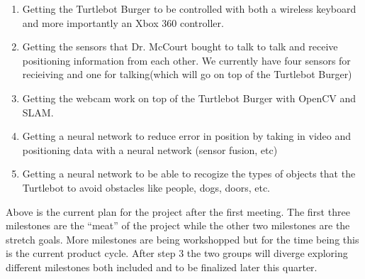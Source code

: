 \documentclass[12pt]{IEEEtran}
\begin{document}
\begin{enumerate}
    \item Getting the Turtlebot Burger to be controlled with both a wireless keyboard and more importantly an Xbox 360 controller.
    \item Getting the sensors that Dr. McCourt bought to talk to talk and receive positioning information from each other. We 
    currently have four sensors for recieiving and one for talking(which will go on top of the Turtlebot Burger)
    \item Getting the webcam work on top of the Turtlebot Burger with OpenCV and SLAM.
    \item Getting a neural network to reduce error in position by taking in video and positioning data with a neural network (sensor 
    fusion, etc)
    \item Getting a neural network to be able to recogize the types of objects that the Turtlebot to avoid obstacles like people, dogs, doors, etc.
\end{enumerate}
 \indent Above is the current plan for the project after the first meeting. The first 
three milestones are the ``meat'' of the project while the other two milestones are the 
stretch goals. More milestones are being workshopped but for the time being this is the 
current product cycle. After step 3 the two groups will diverge exploring different milestones
both included and to be finalized later this quarter. 
\end{document}
